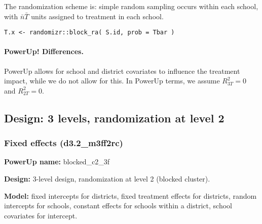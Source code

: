 \documentclass[12pt]{article}
\begin{document}
The randomization scheme is: simple random sampling occurs within each school, with $\bar{n}\bar{T}$ units assigned to treatment in each school.
\begin{verbatim}
T.x <- randomizr::block_ra( S.id, prob = Tbar )
\end{verbatim}

\paragraph{PowerUp! Differences.}
PowerUp allows for school and district covariates to influence the treatment impact, while we do not allow for this. In PowerUp terms, we assume $R^2_{3T} = 0$ and $R^2_{2T} = 0$.



\newpage 
\subsection{Design: 3 levels, randomization at level 2}


\subsubsection{Fixed effects (d3.2\_m3ff2rc)}

\textbf{PowerUp name:} blocked\_c2\_3f

\textbf{Design:} 3-level design, randomization at level 2 (blocked cluster).

\textbf{Model:} fixed intercepts for districts, fixed treatment effects for districts, random intercepts for schools, constant effects for schools within a district, school covariates for intercept.
\end{document}
